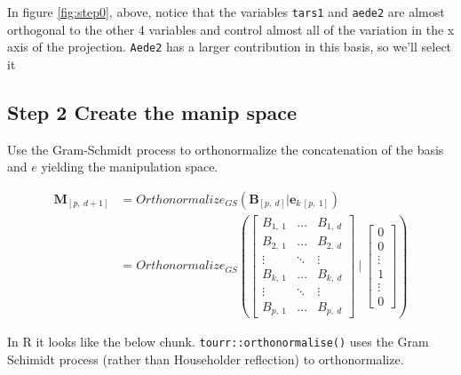 \documentclass{monashthesis}
\begin{document}
In figure \ref{fig:step0}, above, notice that the variables
\texttt{tars1} and \texttt{aede2} are almost orthogonal to the other 4
variables and control almost all of the variation in the x axis of the
projection. \texttt{Aede2} has a larger contribution in this basis, so
we'll select it

\subsection{Step 2 Create the manip
space}\label{step-2-create-the-manip-space}

Use the Gram-Schmidt process to orthonormalize the concatenation of the
basis and \(e\) yielding the manipulation space.

\begin{align*}
  \textbf{M}_{[p,~d+1]}
  &= Orthonormalize_{GS}( \textbf{B}_{[p,~d]}|\textbf{e}_{k~[p,~1]} ) \\
  &= Orthonormalize_{GS}
  \left(
    \begin{bmatrix}
      B_{1,~1} & \dots  & B_{1,~d} \\
      B_{2,~1} & \dots  & B_{2,~d} \\
      \vdots   & \ddots & \vdots   \\
      B_{k,~1} & \dots  & B_{k,~d} \\
      \vdots   & \ddots & \vdots   \\
      B_{p,~1} & \dots  & B_{p,~d}
    \end{bmatrix}
  ~|~
    \begin{bmatrix}
      0 \\
      0 \\
      \vdots \\
      1 \\
      \vdots \\
      0
    \end{bmatrix}
  \right)
\end{align*}

In R it looks like the below chunk. \texttt{tourr::orthonormalise()}
uses the Gram Schimidt process (rather than Householder reflection) to
orthonormalize.

\begin{Shaded}
\begin{Highlighting}[]
\StringTok{ }\NormalTok{(}\NormalTok{, } 
\StringTok{ }
\StringTok{ }\OperatorTok{::}\NormalTok{(}
\end{Highlighting}
\end{Shaded}
\end{document}
